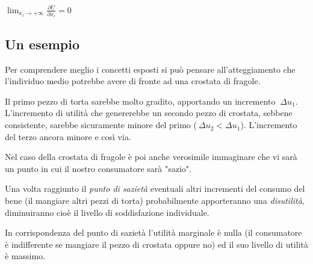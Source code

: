 \(\lim_{x_i \rightarrow +\infty} \frac{\partial U}{\partial x_i} = 0\)

\subsection{Un esempio}

Per comprendere meglio i concetti esposti si può pensare all'atteggiamento che 
l'individuo medio potrebbe avere di fronte ad una crostata di fragole.

Il primo pezzo di torta sarebbe molto gradito, apportando un incremento \(\ 
\Delta u_1\). L'incremento di utilità che genererebbe un secondo pezzo di 
crostata, sebbene consistente, sarebbe sicuramente minore del primo (\(\ 
\Delta u_2 < \Delta u_1\)). L'incremento del terzo ancora minore e così 
via.

Nel caso della crostata di fragole è poi anche verosimile immaginare che vi 
sarà 
un punto in cui il nostro consumatore sarà "sazio".

Una volta raggiunto il \emph{punto di sazietà} eventuali altri incrementi del 
consumo del bene (il mangiare altri pezzi di torta) probabilmente apporteranno 
una \emph{disutilità}, diminuiranno cioè il livello di soddisfazione 
individuale.

In corrispondenza del punto di sazietà l'utilità marginale è nulla (il 
consumatore è indifferente se mangiare il pezzo di crostata oppure no) ed il 
suo livello di utilità è massimo.

